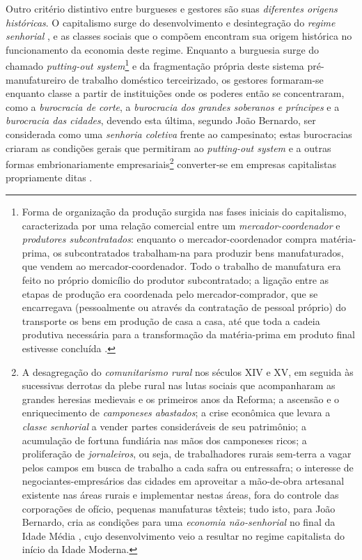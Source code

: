 Outro critério distintivo entre burgueses e gestores são suas \textit{diferentes origens históricas}. O capitalismo surge do desenvolvimento e desintegração do \textit{regime senhorial} \cite{BERNARDO1995, BERNARDO1997, BERNARDO2002}, e as classes sociais que o compõem encontram sua origem histórica no funcionamento da economia deste regime. Enquanto a burguesia surge do chamado \textit{putting-out system}\footnote{Forma de organização da produção surgida nas fases iniciais do capitalismo, caracterizada por uma relação comercial entre um \textit{mercador-coordenador} e \textit{produtores subcontratados}: enquanto o mercador-coordenador compra matéria-prima, os subcontratados trabalham-na para produzir bens manufaturados, que vendem ao mercador-coordenador. Todo o trabalho de manufatura era feito no próprio domicílio do produtor subcontratado; a ligação entre as etapas de produção era coordenada pelo mercador-comprador, que se encarregava (pessoalmente ou através da contratação de pessoal próprio) do transporte os bens em produção de casa a casa, até que toda a cadeia produtiva necessária para a transformação da matéria-prima em produto final estivesse concluída \cite[p.~215-216]{WILLIAMSON1985}.} e da fragmentação própria deste sistema pré-manufatureiro de trabalho doméstico terceirizado, os gestores formaram-se enquanto classe a partir de instituições onde os poderes então se concentraram, como a \textit{burocracia de corte}, a \textit{burocracia dos grandes soberanos e príncipes} e a \textit{burocracia das cidades}, devendo esta última, segundo João Bernardo, ser considerada como uma \textit{senhoria coletiva} frente ao campesinato; estas burocracias criaram as condições gerais que permitiram ao \textit{putting-out system} e a outras formas embrionariamente empresariais\footnote{A desagregação do \textit{comunitarismo rural} nos séculos XIV e XV, em seguida às sucessivas derrotas da plebe rural nas lutas sociais que acompanharam as grandes heresias medievais e os primeiros anos da Reforma; a ascensão e o enriquecimento de \textit{camponeses abastados}; a crise econômica que levara a \textit{classe senhorial} a vender partes consideráveis de seu patrimônio; a acumulação de fortuna fundiária nas mãos dos camponeses ricos; a proliferação de \textit{jornaleiros}, ou seja, de trabalhadores rurais sem-terra a vagar pelos campos em busca de trabalho a cada safra ou entressafra; o interesse de negociantes-empresários das cidades em aproveitar a mão-de-obra artesanal existente nas áreas rurais e implementar nestas áreas, fora do controle das corporações de ofício, pequenas manufaturas têxteis; tudo isto, para João Bernardo, cria as condições para uma \textit{economia não-senhorial} no final da Idade Média \cite[p.~579-623]{BERNARDO2002}, cujo desenvolvimento veio a resultar no regime capitalista do início da Idade Moderna.} converter-se em empresas capitalistas propriamente ditas \cite[p.~208]{BERNARDO1991}. 


